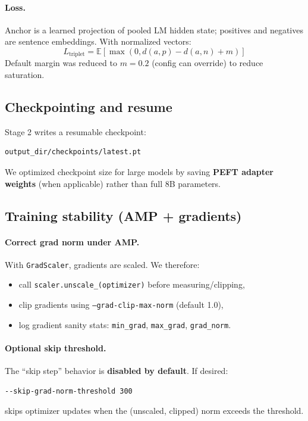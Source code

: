 \documentclass[11pt]{article}
\begin{document}
\paragraph{Loss.}
Anchor is a learned projection of pooled LM hidden state; positives and negatives are sentence embeddings. With normalized vectors:
\[
L_{\text{triplet}} = \mathbb{E}\left[\max(0, d(a,p)-d(a,n)+m)\right]
\]
Default margin was reduced to $m=0.2$ (config can override) to reduce saturation.

\subsection{Checkpointing and resume}
Stage 2 writes a resumable checkpoint:
\begin{lstlisting}
output_dir/checkpoints/latest.pt
\end{lstlisting}
We optimized checkpoint size for large models by saving \textbf{PEFT adapter weights} (when applicable) rather than full 8B parameters.

\subsection{Training stability (AMP + gradients)}
\paragraph{Correct grad norm under AMP.}
With \texttt{GradScaler}, gradients are scaled. We therefore:
\begin{itemize}
  \item call \texttt{scaler.unscale\_(optimizer)} before measuring/clipping,
  \item clip gradients using \texttt{--grad-clip-max-norm} (default 1.0),
  \item log gradient sanity stats: \texttt{min\_grad}, \texttt{max\_grad}, \texttt{grad\_norm}.
\end{itemize}

\paragraph{Optional skip threshold.}
The ``skip step'' behavior is \textbf{disabled by default}. If desired:
\begin{lstlisting}
--skip-grad-norm-threshold 300
\end{lstlisting}
skips optimizer updates when the (unscaled, clipped) norm exceeds the threshold.
\end{document}
